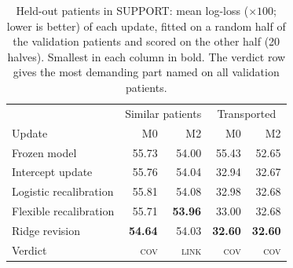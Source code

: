 \begin{table}[t]
\centering
\caption{Held-out patients in SUPPORT: mean log-loss ($\times100$; lower is better) of each update, fitted on a random half of the validation patients and scored on the other half (20 halves). Smallest in each column in bold. The verdict row gives the most demanding part named on all validation patients.}
\label{t:heldout}
\small
\begin{tabular}{lrrrr}
\toprule
 & \multicolumn{2}{c}{Similar patients} & \multicolumn{2}{c}{Transported} \\
Update & M0 & M2 & M0 & M2 \\
\midrule
Frozen model & 55.73 & 54.00 & 55.43 & 52.65 \\
Intercept update & 55.76 & 54.04 & 32.94 & 32.67 \\
Logistic recalibration & 55.81 & 54.08 & 32.98 & 32.68 \\
Flexible recalibration & 55.71 & \textbf{53.96} & 33.00 & 32.68 \\
Ridge revision & \textbf{54.64} & 54.03 & \textbf{32.60} & \textbf{32.60} \\
\midrule
Verdict & \textsc{cov} & \textsc{link} & \textsc{cov} & \textsc{cov} \\
\bottomrule
\end{tabular}
\end{table}

